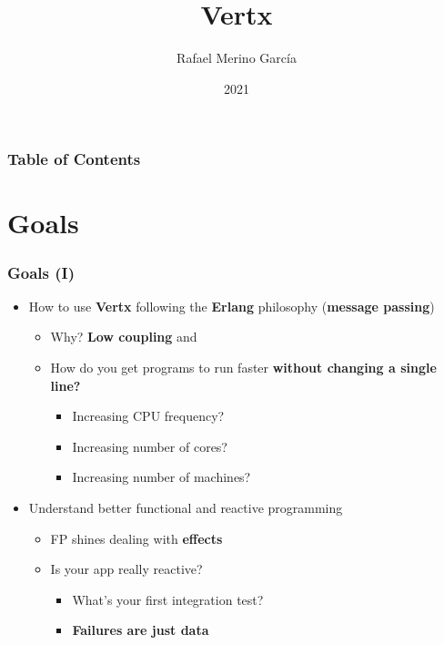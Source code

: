 \documentclass{beamer}
\title{Vertx}
\author{Rafael Merino García}
\institute{@imrafaelmerino}
\date{2021}
\begin{document}
\frame{\titlepage}

\begin{frame}
\frametitle{Table of Contents}
\tableofcontents
\end{frame}

\section{Goals}

\begin{frame}
\frametitle{Goals (I)}
\begin{itemize}
    \item<1-> How to use  \textbf{Vertx} following the \textbf{Erlang} philosophy (\textbf{message passing})
    \begin{itemize}
        \item<2-> Why? \textbf{Low coupling} and  
        \item<3-> How do you get programs to run faster  \textbf{without changing a single line?}
            \begin{itemize}
               \item<4-> Increasing CPU frequency?      
               \item<5-> Increasing number of cores?
               \item<6-> Increasing number of machines?
            \end{itemize}    
     \end{itemize}    
    \item<7-> Understand better functional and reactive programming
    \begin{itemize}
        \item<8-> FP shines dealing with \textbf{effects}       
        \item<9-> Is your app really reactive? 
            \begin{itemize}
                 \item<10-> What's your first integration test?      
                 \item<11-> \textbf{Failures are just data}
           \end{itemize}   
    \end{itemize}    
\end{itemize}    
\end{frame} 
\end{document}
